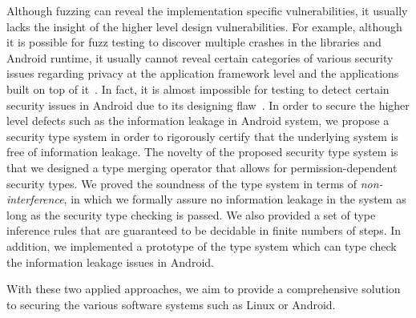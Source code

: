 Although fuzzing can reveal the implementation specific vulnerabilities, it usually lacks the insight of the higher level design vulnerabilities. For example, although it is possible for fuzz testing to discover multiple crashes in the libraries and Android runtime, it usually cannot reveal certain categories of various security issues regarding privacy at the application framework level and the applications built on top of it~\cite{Enck:2009:UAS:1512148.1512324,Ernst:2014}. In fact, it is almost impossible for testing to detect certain security issues in Android due to its designing flaw~\cite{url:android-flaw}. In order to secure the higher level defects such as the information leakage in Android system, we propose a security type system in order to rigorously certify that the underlying system is free of information leakage. The novelty of the proposed security type system is that we designed a type merging operator that allows for permission-dependent security types. We proved the soundness of the type system in terms of \emph{non-interference}, in which we formally assure no information leakage in the system as long as the security type checking is passed. We also provided a set of type inference rules that are guaranteed to be decidable in finite numbers of steps. In addition, we implemented a prototype of the type system which can type check the information leakage issues in Android.

With these two applied approaches, we aim to provide a comprehensive solution to securing the various software systems such as Linux or Android.

